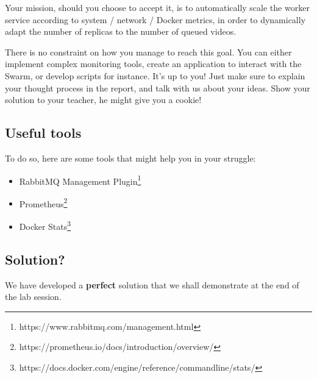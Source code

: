 \documentclass[a4paper,11pt]{exam}
\begin{document}
Your mission, should you choose to accept it, is to automatically scale the worker service according to system / network / Docker metrics, in order to dynamically adapt the number of replicas to the number of queued videos.

There is no constraint on how you manage to reach this goal.
You can either implement complex monitoring tools, create an application to interact with the Swarm, or develop scripts for instance.
It's up to you!
Just make sure to explain your thought process in the report, and talk with us about your ideas.
Show your solution to your teacher, he might give you a cookie!

\subsection{Useful tools}

To do so, here are some tools that might help you in your struggle:

\begin{itemize}

\item RabbitMQ Management Plugin\footnote{https://www.rabbitmq.com/management.html}

\item Prometheus\footnote{https://prometheus.io/docs/introduction/overview/}

\item Docker Stats\footnote{https://docs.docker.com/engine/reference/commandline/stats/}

\end{itemize}

\subsection{Solution?}

We have developed a \textbf{perfect} solution that we shall demonstrate at the end of the lab session.
\end{document}
